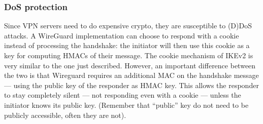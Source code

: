 \subsubsection{DoS protection}

Since VPN servers need to do expensive crypto, they are susceptible to (D)DoS attacks. A WireGuard implementation can choose to respond with a cookie instead of processing the handshake: the initiator will then use this cookie as a key for computing HMACs of their message. The cookie mechanism of IKEv2 is very similar to the one just described. However, an important difference between the two is that Wireguard requires an additional MAC on the handshake message — using the public key of the responder as HMAC key. This allows the responder to stay completely silent — not responding even with a cookie — unless the initiator knows its public key. (Remember that “public” key do not need to be publicly accessible, often they are not).


